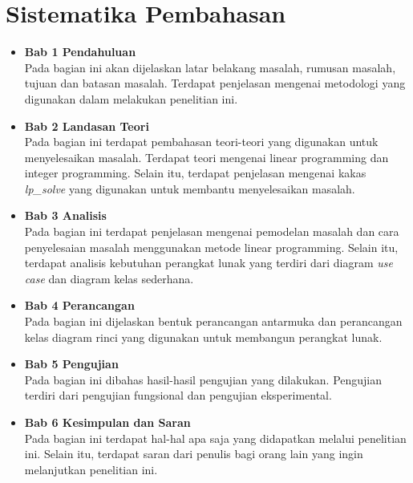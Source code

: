 \section{Sistematika Pembahasan}
\label{sec:sispem}
\begin{itemize}
	\item \textbf{Bab 1 Pendahuluan}\\
	Pada bagian ini akan dijelaskan latar belakang masalah, rumusan masalah, tujuan dan batasan masalah. Terdapat penjelasan mengenai metodologi yang digunakan dalam melakukan penelitian ini.
	\item \textbf{Bab 2 Landasan Teori}\\
	Pada bagian ini terdapat pembahasan teori-teori yang digunakan untuk menyelesaikan masalah. Terdapat teori mengenai linear programming dan integer programming. Selain itu, terdapat penjelasan mengenai kakas \textit{lp{\_}solve} yang digunakan untuk membantu menyelesaikan masalah.
	\item \textbf{Bab 3 Analisis}\\
	Pada bagian ini terdapat penjelasan mengenai pemodelan masalah dan cara penyelesaian masalah menggunakan metode linear programming. Selain itu, terdapat analisis kebutuhan perangkat lunak yang terdiri dari diagram \textit{use case} dan diagram kelas sederhana.
	\item \textbf{Bab 4 Perancangan}\\
	Pada bagian ini dijelaskan bentuk perancangan antarmuka dan perancangan kelas diagram rinci yang digunakan untuk membangun perangkat lunak.
	\item \textbf{Bab 5 Pengujian}\\
	Pada bagian ini dibahas hasil-hasil pengujian yang dilakukan. Pengujian terdiri dari pengujian fungsional dan pengujian eksperimental.
	\item \textbf{Bab 6 Kesimpulan dan Saran}\\
	Pada bagian ini terdapat hal-hal apa saja yang didapatkan melalui penelitian ini. Selain itu, terdapat saran dari penulis bagi orang lain yang ingin melanjutkan penelitian ini.
\end{itemize}